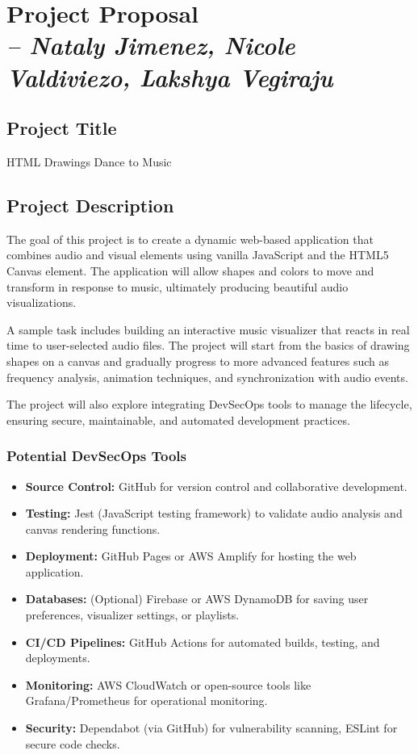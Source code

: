 \chapter{Project Proposal \\
\small{\textit{-- Nataly Jimenez, Nicole Valdiviezo, Lakshya Vegiraju}}
\label{Chapter::Project Proposal}}

\section*{Project Title}
HTML Drawings Dance to Music

\section*{Project Description}
The goal of this project is to create a dynamic web-based application that combines audio and visual elements using vanilla JavaScript and the HTML5 Canvas element. The application will allow shapes and colors to move and transform in response to music, ultimately producing beautiful audio visualizations.  

A sample task includes building an interactive music visualizer that reacts in real time to user-selected audio files. The project will start from the basics of drawing shapes on a canvas and gradually progress to more advanced features such as frequency analysis, animation techniques, and synchronization with audio events.  

The project will also explore integrating DevSecOps tools to manage the lifecycle, ensuring secure, maintainable, and automated development practices.  

\subsection*{Potential DevSecOps Tools}
\begin{itemize}
    \item \textbf{Source Control:} GitHub for version control and collaborative development.
    \item \textbf{Testing:} Jest (JavaScript testing framework) to validate audio analysis and canvas rendering functions.
    \item \textbf{Deployment:} GitHub Pages or AWS Amplify for hosting the web application.
    \item \textbf{Databases:} (Optional) Firebase or AWS DynamoDB for saving user preferences, visualizer settings, or playlists.
    \item \textbf{CI/CD Pipelines:} GitHub Actions for automated builds, testing, and deployments.
    \item \textbf{Monitoring:} AWS CloudWatch or open-source tools like Grafana/Prometheus for operational monitoring.
    \item \textbf{Security:} Dependabot (via GitHub) for vulnerability scanning, ESLint for secure code checks.
\end{itemize}

